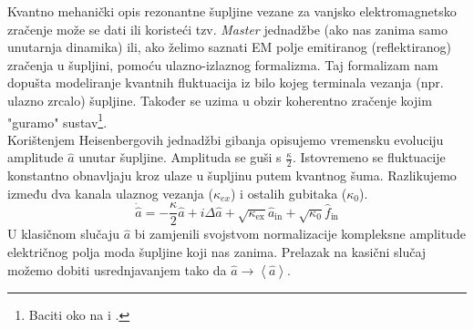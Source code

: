 Kvantno mehanički opis rezonantne šupljine vezane za vanjsko elektromagnetsko zračenje može se dati ili koristeći tzv. \textit{Master} jednadžbe (ako nas
zanima samo unutarnja dinamika) ili, ako želimo saznati EM polje emitiranog (reflektiranog) zračenja u šupljini, pomoću ulazno-izlaznog formalizma. 
Taj formalizam nam dopušta modeliranje kvantnih fluktuacija iz bilo kojeg terminala vezanja (npr. ulazno zrcalo) šupljine. Također se uzima u obzir koherentno
zračenje kojim "guramo" sustav\footnote{Baciti oko na \cite{gardiner_zoller_2004} i \cite{clerk_devoret_girvin_marquardt_schoelkopf_2010}.}.\\
Korištenjem Heisenbergovih jednadžbi gibanja opisujemo vremensku evoluciju amplitude $\hat{a}$ unutar šupljine. Amplituda se guši s $\frac{\kappa}{2}$. Istovremeno
se fluktuacije konstantno obnavljaju kroz ulaze u šupljinu putem kvantnog šuma. Razlikujemo između dva kanala ulaznog vezanja ($\kappa_{ex}$) i ostalih gubitaka ($\kappa_0$).
\begin{equation}
\dot{\hat{a}}=-\frac{\kappa}{2} \hat{a}+i \Delta \hat{a}+\sqrt{\kappa_{\mathrm{ex}}} \hat{a}_{\mathrm{in}}+\sqrt{\kappa_0} \hat{f}_{\mathrm{in}}
\label{eq1}
\end{equation}
U klasičnom slučaju $\hat{a}$ bi zamjenili svojstvom normalizacije kompleksne amplitude električnog polja moda šupljine koji nas zanima. 
Prelazak na kasični slučaj možemo dobiti usrednjavanjem tako da $\hat{a} \rightarrow \left<\hat{a}\right>$.

